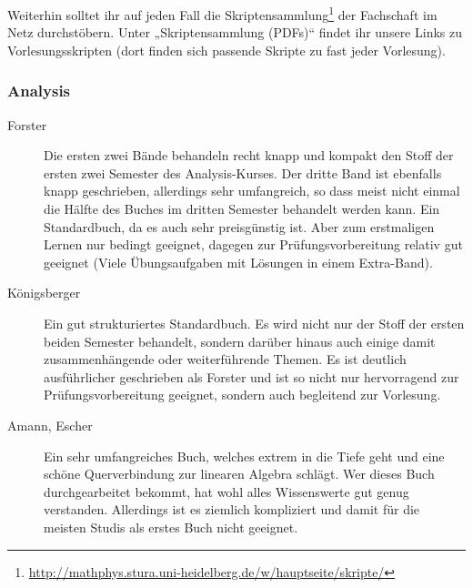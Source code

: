 Weiterhin solltet ihr auf jeden Fall die Skriptensammlung\footnote{\url{http://mathphys.stura.uni-heidelberg.de/w/hauptseite/skripte/}} der Fachschaft im Netz durchstöbern. Unter „Skriptensammlung (PDFs)“ findet ihr unsere Links zu Vorlesungsskripten (dort finden sich passende Skripte zu fast jeder Vorlesung).

\subsubsection{Analysis}
\begin{description}
\item[Forster]{
		Die ersten zwei Bände behandeln recht knapp und kompakt den Stoff der ersten zwei Semester des Analysis-Kurses. Der dritte Band ist ebenfalls knapp geschrieben, allerdings sehr umfangreich, so dass meist nicht einmal die Hälfte des Buches im dritten Semester behandelt werden kann. Ein Standardbuch, da es auch sehr preisgünstig ist. Aber zum erstmaligen Lernen nur bedingt geeignet, dagegen zur Prüfungsvorbereitung relativ gut geeignet (Viele Übungsaufgaben mit Lösungen in einem Extra-Band).}

\item[Königsberger]{
		Ein gut strukturiertes Standardbuch. Es wird nicht nur der Stoff der ersten beiden Semester behandelt, sondern darüber hinaus auch einige damit zusammenhängende oder weiterführende Themen. Es ist deutlich ausführlicher geschrieben als Forster und ist so nicht nur hervorragend zur Prüfungsvorbereitung geeignet, sondern auch begleitend zur Vorlesung.}

\item[Amann, Escher]{
		Ein sehr umfangreiches Buch, welches extrem in die Tiefe geht und eine schöne Querverbindung zur linearen Algebra schlägt. Wer dieses Buch durchgearbeitet bekommt, hat wohl alles Wissenswerte gut genug verstanden. Allerdings ist es ziemlich kompliziert und damit für die meisten Studis als erstes Buch nicht geeignet.}
\end{description}


